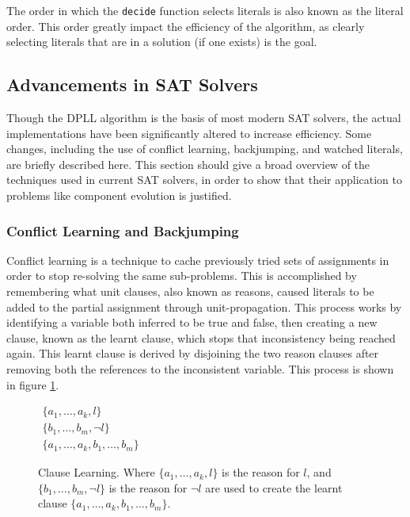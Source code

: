 The order in which the \verb+decide+ function selects literals is also known as the literal order.
This order greatly impact the efficiency of the algorithm, as clearly selecting literals that are in a solution (if one exists) is the goal.

\subsection{Advancements in SAT Solvers}
Though the DPLL algorithm is the basis of most modern SAT solvers, the actual implementations have been significantly altered to increase efficiency.
Some changes, including the use of conflict learning, backjumping, and watched literals, are briefly described here.
This section should give a broad overview of the techniques used in current SAT solvers, 
in order to show that their application to problems like component evolution is justified. 

\subsubsection{Conflict Learning and Backjumping}
Conflict learning \citep{stallman1976} is a technique to cache previously tried sets of assignments in order to stop re-solving the same sub-problems.
This is accomplished by remembering what unit clauses, also known as reasons, caused literals to be added to the partial assignment through unit-propagation. 
This process works by identifying a variable both inferred to be true and false,
then creating a new clause, known as the learnt clause, which stops that inconsistency being reached again.
This learnt clause is derived by disjoining the two reason clauses after removing both the references to the inconsistent variable.
This process is shown in figure \ref{impl.clauselearning}. 

\begin{figure}[htp]
\begin{center}
$\begin{array}{c}
\{a_1,\ldots,a_k, l\} \\
 \{b_1,\ldots,b_m,\neg l\}\\
\hline
\{a_1,\ldots,a_k, b_1,\ldots,b_m \}
\end{array}$
  \caption{Clause Learning. Where $\{a_1,\ldots,a_k, l\}$ is the reason for $l$, and $\{b_1,\ldots,b_m,\neg l\}$ is the reason for $\neg l$
   are used to create the learnt clause $\{a_1,\ldots,a_k, b_1,\ldots,b_m \}$.}
  \label{impl.clauselearning}
\end{center}
\end{figure}

